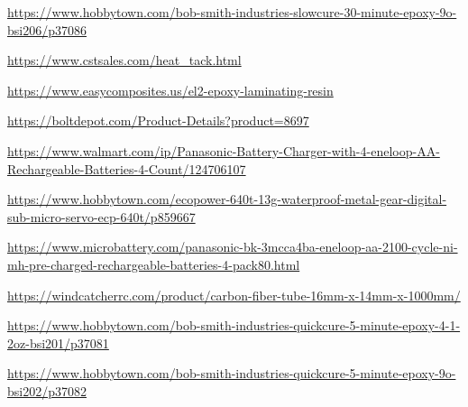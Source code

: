 \documentclass[11pt]{article}
\begin{document}
{\begin{enumerate}[label={[\arabic*]}]
\item \url{https://www.hobbytown.com/bob-smith-industries-slowcure-30-minute-epoxy-9o-bsi206/p37086}
\item \url{https://www.cstsales.com/heat_tack.html}
\item \url{https://www.easycomposites.us/el2-epoxy-laminating-resin}
\item \url{https://boltdepot.com/Product-Details?product=8697}
\item \url{https://www.walmart.com/ip/Panasonic-Battery-Charger-with-4-eneloop-AA-Rechargeable-Batteries-4-Count/124706107}
\item \url{https://www.hobbytown.com/ecopower-640t-13g-waterproof-metal-gear-digital-sub-micro-servo-ecp-640t/p859667}
\item \url{https://www.microbattery.com/panasonic-bk-3mcca4ba-eneloop-aa-2100-cycle-ni-mh-pre-charged-rechargeable-batteries-4-pack80.html}
\item \url{https://windcatcherrc.com/product/carbon-fiber-tube-16mm-x-14mm-x-1000mm/}
\item \url{https://www.hobbytown.com/bob-smith-industries-quickcure-5-minute-epoxy-4-1-2oz-bsi201/p37081}
\item \url{https://www.hobbytown.com/bob-smith-industries-quickcure-5-minute-epoxy-9o-bsi202/p37082}
\end{enumerate}}
\end{document}
